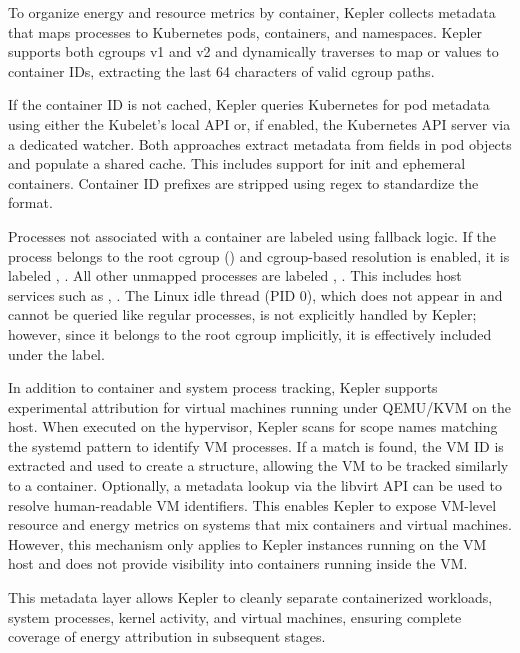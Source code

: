 To organize energy and resource metrics by container, Kepler collects metadata that maps processes to Kubernetes pods, containers, and namespaces. Kepler supports both cgroups v1 and v2 and dynamically traverses  to map  or  values to container IDs, extracting the last 64 characters of valid cgroup paths.

If the container ID is not cached, Kepler queries Kubernetes for pod metadata using either the Kubelet's local  API or, if enabled, the Kubernetes API server via a dedicated watcher. Both approaches extract metadata from  fields in pod objects and populate a shared cache. This includes support for init and ephemeral containers. Container ID prefixes are stripped using regex to standardize the format.

Processes not associated with a container are labeled using fallback logic. If the process belongs to the root cgroup () and cgroup-based resolution is enabled, it is labeled , . All other unmapped processes are labeled , . This includes host services such as , . The Linux idle thread (PID 0), which does not appear in  and cannot be queried like regular processes, is not explicitly handled by Kepler; however, since it belongs to the root cgroup implicitly, it is effectively included under the  label.

In addition to container and system process tracking, Kepler supports experimental attribution for virtual machines running under QEMU/KVM on the host. When executed on the hypervisor, Kepler scans  for scope names matching the systemd pattern  to identify VM processes. If a match is found, the VM ID is extracted and used to create a  structure, allowing the VM to be tracked similarly to a container. Optionally, a metadata lookup via the libvirt API can be used to resolve human-readable VM identifiers. This enables Kepler to expose VM-level resource and energy metrics on systems that mix containers and virtual machines. However, this mechanism only applies to Kepler instances running on the VM host and does not provide visibility into containers running inside the VM.

This metadata layer allows Kepler to cleanly separate containerized workloads, system processes, kernel activity, and virtual machines, ensuring complete coverage of energy attribution in subsequent stages.

